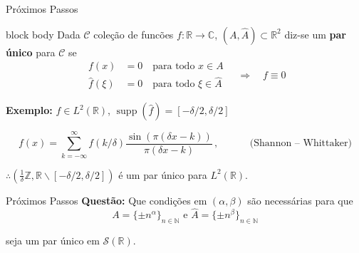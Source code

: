 \documentclass{beamer}
\begin{document}
\begin{frame}{Próximos Passos}
\begin{beamercolorbox}[colsep*=.75ex, rounded=true, shadow=false]{block body}
    Dada $\mathcal{C}$ coleção de funcões $f: \mathbb{R} \rightarrow \mathbb{C}$, $(A, \widehat{A}) \subset \mathbb{R}^2$ diz-se um \textbf{par único} para $\mathcal{C}$ se 
    \[
    \begin{aligned}
        f(x) &= 0 \quad \text{para todo } x \in A\\
        \hat{f}(\xi) &= 0 \quad \text{para todo } \xi \in \widehat{A}
    \end{aligned}
    \quad \Rightarrow \quad
    f \equiv 0
    \]
\end{beamercolorbox}
\vspace{0.2cm}

\pause

\textbf{Exemplo:} $f \in L^2(\mathbb{R})$, $\operatorname{supp}(\hat{f})=[-\delta/2,\delta/2] $
\vspace{-0.5cm}

$$f(x) = \sum_{k=-\infty}^\infty{f(k/\delta)\frac{\sin(\pi(\delta x-k))}{\pi(\delta x-k)}}\,, \;\;\;\;\;\;\;\;\;\;\text{ (Shannon –
Whittaker)}$$

$\therefore \left(\frac{1}{\delta}\mathbb{Z}, \mathbb{R} \backslash [-\delta/2,\delta/2]  \right)$ é um par único para $L^2 (\mathbb{R})$.
\vspace{0.6cm}

\end{frame}

\begin{frame}{Próximos Passos}
    \textbf{Questão:} Que condições em $(\alpha, \beta)$ são necessárias para que
    $$A=\{\pm n^\alpha \}_{n \in \mathbb{N}} \text{ e } \hat{A}=\{\pm n^\beta \}_{n \in \mathbb{N}}$$

    seja um par único em $\mathcal{S}(\mathbb{R}).$
\end{frame}
\end{document}

